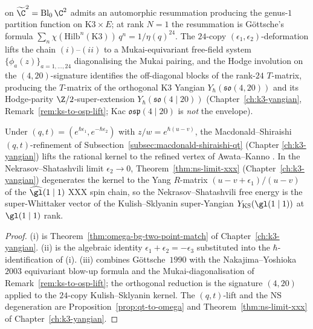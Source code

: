 \begin{theorem}
\begin{enumerate}[label=\textup{(\roman*)}]
\cite{NakajimaYoshioka2003a,NakajimaYoshioka2003b} on
$\widetilde{\C}^2 = \mathrm{Bl}_0\,\C^2$ admits an automorphic
resummation producing the genus-$1$ partition function on
$\mathrm K3 \times E$; at rank $N = 1$ the resummation is
G\"ottsche's formula
$\sum_n \chi(\mathrm{Hilb}^n(\mathrm K3))\, q^n = 1/\eta(q)^{24}$.
The $24$-copy $(\epsilon_1, \epsilon_2)$-deformation lifts the chain
$(i)$--$(ii)$ to a Mukai-equivariant free-field system
$\{\phi_a(z)\}_{a = 1, \ldots, 24}$ diagonalising the Mukai pairing,
and the Hodge involution on the $(4, 20)$-signature identifies the
off-diagonal blocks of the rank-$24$ $T$-matrix, producing the
$T$-matrix of the orthogonal K$3$ Yangian
$Y_\hbar(\mathfrak{so}(4, 20))$ and its Hodge-parity
$\Z/2$-super-extension $Y_\hbar(\mathfrak{so}(4 \mid 20))$
\textup{(}Chapter~\ref{ch:k3-yangian},
Remark~\ref{rem:ks-to-osp-lift}; Kac $\mathfrak{osp}(4 \mid 20)$
is \emph{not} the envelope\textup{).}
\end{enumerate}
Under $(q, t) = (e^{\hbar\epsilon_1}, e^{-\hbar\epsilon_2})$ with
$z/w = e^{\hbar(u - v)}$, the Macdonald--Shiraishi $(q, t)$-refinement
of Subsection~\ref{subsec:macdonald-shiraishi-qt} \textup{(}Chapter
\ref{ch:k3-yangian}\textup{)} lifts the rational kernel to the refined
vertex of Awata--Kanno \cite{AwataKanno2008}. In the Nekrasov--Shatashvili
limit $\epsilon_2 \to 0$, Theorem~\ref{thm:ns-limit-xxx}
\textup{(}Chapter~\ref{ch:k3-yangian}\textup{)} degenerates the kernel
to the Yang $R$-matrix $(u - v + \epsilon_1)/(u - v)$ of the
$\widehat{\gl}(1 \mid 1)$ XXX spin chain, so the
Nekrasov--Shatashvili \cite{NekrasovShatashvili2009} free energy is
the super-Whittaker vector of the Kulish--Sklyanin super-Yangian
$Y_{\mathrm{KS}}(\gl(1 \mid 1))$ at $\gl(1 \mid 1)$ rank.
\end{theorem}

\begin{proof}
(i) is Theorem~\ref{thm:omega-bg-two-point-match} of
Chapter~\ref{ch:k3-yangian}. (ii) is the algebraic identity
$\epsilon_1 + \epsilon_2 = -\epsilon_3$ substituted into the $\hbar$-identification
of (i). (iii) combines G\"ottsche~$1990$ with the
Nakajima--Yoshioka~$2003$ equivariant blow-up formula and the
Mukai-diagonalisation of Remark~\ref{rem:ks-to-osp-lift}; the
orthogonal reduction is the signature $(4, 20)$ applied to the
$24$-copy Kulish--Sklyanin kernel. The $(q, t)$-lift and the NS
degeneration are
Proposition~\ref{prop:qt-to-omega} and
Theorem~\ref{thm:ns-limit-xxx} of Chapter~\ref{ch:k3-yangian}.
\end{proof}

